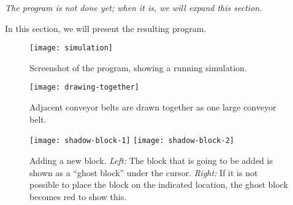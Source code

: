 \textit{The program is not done yet; when it is, we will expand this section.}

In this section, we will present the resulting program.

\begin{figure}
  \begin{center}
    \texttt{[image: simulation]}
    \caption{Screenshot of the program, showing a running simulation.}
    \label{fig:simulation}
  \end{center}
\end{figure}

\begin{figure}
  \begin{center}
    \texttt{[image: drawing-together]}
    \caption{Adjacent conveyor belts are drawn together as one large conveyor belt.}
    \label{fig:drawing-together}
  \end{center}
\end{figure}

\begin{figure}
  \begin{center}
    \texttt{[image: shadow-block-1]}
    \quad
    \texttt{[image: shadow-block-2]}
    \caption{Adding a new block. \textit{Left:} The block that is going to be added is shown as a ``ghost block'' under the cursor. \textit{Right:} If it is not possible to place the block on the indicated location, the ghost block becomes red to show this.}
    \label{fig:shadow-block}
  \end{center}
\end{figure}
